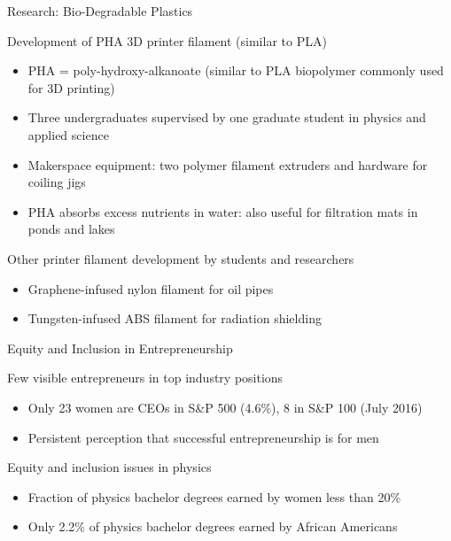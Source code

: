 \documentclass[xcolor=table,compress,professionalfonts,pdfpagelabels]{beamer}
\begin{document}
\begin{frame}{Research: Bio-Degradable Plastics}
 \begin{block}{Development of PHA 3D printer filament (similar to PLA)}
  \begin{itemize}
   \item PHA = poly-hydroxy-alkanoate (similar to PLA biopolymer commonly used for 3D printing)
   \item Three undergraduates supervised by one graduate student in physics and applied science
   \item Makerspace equipment: two polymer filament extruders and hardware for coiling jigs
   \item PHA absorbs excess nutrients in water: also useful for filtration mats in ponds and lakes
  \end{itemize}
 \end{block}
 \begin{block}{Other printer filament development by students and researchers}
  \begin{itemize}
   \item Graphene-infused nylon filament for oil pipes
   \item Tungsten-infused ABS filament for radiation shielding
  \end{itemize}
 \end{block}
\end{frame}

\begin{frame}{Equity and Inclusion in Entrepreneurship}
 \begin{block}{Few visible entrepreneurs in top industry positions}
  \begin{itemize}
   \item Only 23 women are CEOs in S\&P 500 (4.6\%), 8 in S\&P 100 (July 2016)
   \item Persistent perception that successful entrepreneurship is for men
  \end{itemize}
 \end{block}
 \begin{block}{Equity and inclusion issues in physics\footnotemark{}}
  \begin{itemize}
   \item Fraction of physics bachelor degrees earned by women less than 20\%
   \item Only 2.2\% of physics bachelor degrees earned by African Americans
  \end{itemize}
 \end{block}
\end{frame}
 
\end{document}
